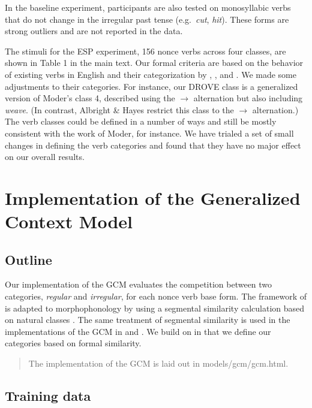 \documentclass[12pt]{article}
\begin{document}
In the baseline experiment, participants are also tested on monosyllabic verbs that do not change in the irregular past tense (e.g.\ {\em cut}, {\em hit}). These forms are strong outliers and are not reported in the data.

The stimuli for the ESP experiment, 156 nonce verbs across four classes, are shown in Table 1 in the main text. Our formal criteria are based on the behavior of existing verbs in English and their categorization by \cite{bybee1982rules}, \cite{moder1992productivity}, and \cite{albright2003rules}. We made some adjustments to their categories. For instance, our DROVE class is a generalized version of Moder's class 4, described using the \textipa{[aI]}$\rightarrow{}$\textipa{[oU]} alternation but also including {\em weave}. (In contrast, Albright \& Hayes restrict this class to the \textipa{[aI]}$\rightarrow{}$\textipa{[oU]} alternation.) The verb classes could be defined in a number of ways and still be mostly consistent with the work of Moder, for instance. We have trialed a set of small changes in defining the verb categories and found that they have no major effect on our overall results.


\section{Implementation of the Generalized Context Model\label{appendixgcm}}

\subsection{Outline}

Our implementation of the GCM evaluates the competition between two categories, {\em regular} and {\em irregular}, for each nonce verb base form. The framework of \cite{nosofsky1990relations} is adapted to morphophonology by using a segmental similarity calculation based on natural classes \citep{frisch1997similarity}. The same treatment of segmental similarity is used in the implementations of the GCM in \cite{albright2003rules} and \cite{dawdy2014learnability}. We build on \cite{dawdy2014learnability} in that we define our categories based on formal similarity. 

\begin{quote}
 The implementation of the GCM is laid out in models/gcm/gcm.html.
\end{quote}

\subsection{Training data}
\end{document}
